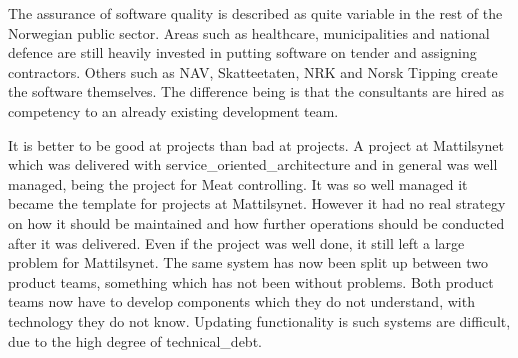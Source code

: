 The assurance of software quality is described as quite variable in the rest of the Norwegian public sector. Areas such as healthcare, municipalities and national defence are still heavily invested in putting software on tender and assigning contractors. Others such as NAV, Skatteetaten, NRK and Norsk Tipping create the software themselves. The difference being is that the consultants are hired as competency to an already existing development team.

It is better to be good at projects than bad at projects. A project at Mattilsynet which was delivered with \gls{service_oriented_architecture} and in general was well managed, being the project for Meat controlling. It was so well managed it became the template for projects at Mattilsynet. However it had no real strategy on how it should be maintained and how further operations should be conducted after it was delivered. Even if the project was well done, it still left a large problem for Mattilsynet. The same system has now been split up between two product teams, something which has not been without problems. Both product teams now have to develop components which they do not understand, with technology they do not know. Updating functionality is such systems are difficult, due to the high degree of \gls{technical_debt}.



